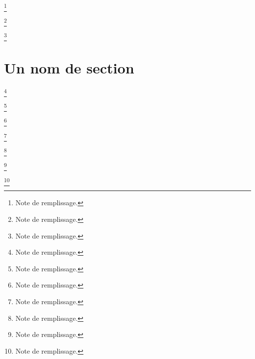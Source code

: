 \label{panom}

\verset{}
\lipsum %
\footnote{Note de remplissage.}

\label{tinom}

\verset{}
\lipsum %
\footnote{Note de remplissage.}

\label{chnom}

\verset{}
\lipsum %
\footnote{Note de remplissage.}

\section{Un nom de section}
\label{secnom}

\verset{}
\lipsum %
\footnote{Note de remplissage.}

\label{pgnom}

\verset{}
\lipsum %
\footnote{Note de remplissage.}

\label{spgnom}

\verset{}
\lipsum %
\footnote{Note de remplissage.}

\label{alnom}

\verset{}
\lipsum %
\footnote{Note de remplissage.}

\label{salnom}

\verset{}
\lipsum %
\footnote{Note de remplissage.}

\label{ptnom}

\verset{}
\lipsum %
\footnote{Note de remplissage.}

\label{sptnom}

\verset{}
\lipsum %
\footnote{Note de remplissage.}
